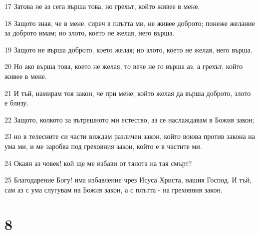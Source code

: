 \par 17 Затова не аз сега върша това, но грехът, който живее в мене.
\par 18 Защото зная, че в мене, сиреч в плътта ми, не живее доброто; понеже желание за доброто имам; но злото, което не желая, него върша.
\par 19 Защото не върша доброто, което желая; но злото, което не желая, него върша.
\par 20 Но ако върша това, което не желая, то вече не го върша аз, а грехът, който живее в мене.
\par 21 И тъй, намирам тоя закон, че при мене, който желая да върша доброто, злото е близу.
\par 22 Защото, колкото за вътрешното ми естество, аз се наслаждавам в Божия закон;
\par 23 но в телесните си части виждам различен закон, който воюва против закона на ума ми, и ме заробва под греховния закон, който е в частите ми.
\par 24 Окаян аз човек! кой ще ме избави от тялота на тая смърт?
\par 25 Благодарение Богу! има избавление чрез Исуса Христа, нашия Господ. И тъй, сам аз с ума слугувам на Божия закон, а с плътта - на греховния закон.

\chapter{8}

